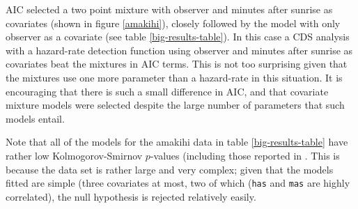 AIC selected a two point mixture with observer and minutes after sunrise as covariates (shown in figure \ref{amakihi}), closely followed by the model with only observer as a covariate (see table \ref{big-results-table}). In this case a CDS analysis with a hazard-rate detection function using observer and minutes after sunrise as covariates beat the mixtures in AIC terms. This is not too surprising given that the mixtures use one more parameter than a hazard-rate in this situation. It is encouraging that there is such a small difference in AIC, and that covariate mixture models were selected despite the large number of parameters that such models entail.

\label{cor-8s13}Note that all of the models for the amakihi data in table \ref{big-results-table} have rather low Kolmogorov-Smirnov $p$-values (including those reported in . This is because the data set is rather large and very complex; given that the models fitted are simple (three covariates at most, two of which (\texttt{has} and \texttt{mas} are highly correlated), the null hypothesis is rejected relatively easily.


